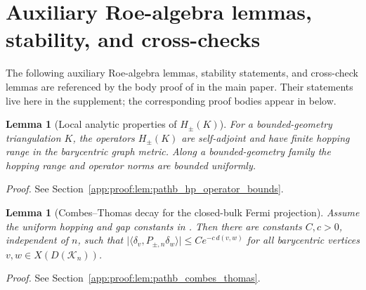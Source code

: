 \documentclass[11pt]{article}
\numberwithin{equation}{section}
\newtheorem{lemma}[theorem]{Lemma}
\theoremstyle{definition}
\theoremstyle{remark}
\newcommand{\proofref}[1]{%
  \par\noindent\emph{Proof.} See Section~\ref{#1}.\par\medskip
}
\newcommand{\proofappendixref}[1]{\proofref{#1}}
\newcommand{\K}{\mathcal{K}}
\begin{document}
\begin{table}[H]
\centering\small
\caption{Periodic triangular Bloch certificate (FHS check; reproduced from the companion script).}
\label{tab:periodic_triangular_certificate}
\end{table}

\begin{table}[H]
\centering\small
\caption{Periodic triangular extension checks (FHS).}
\label{tab:periodic_triangular_extension_certificate}
\end{table}

\section{Auxiliary Roe-algebra lemmas, stability, and cross-checks}\label{sec:roe_auxiliaries}

The following auxiliary Roe-algebra lemmas, stability statements, and cross-check lemmas are
referenced by the body proof of  in the main paper. Their
statements live here in the supplement; the corresponding proof bodies appear in
 below.

\begin{lemma}[Local analytic properties of \(H_\pm(K)\)]\label{lem:pathb_hp_operator_bounds}
For a bounded-geometry triangulation \(K\), the operators \(H_\pm(K)\) are self-adjoint and have
finite hopping range in the barycentric graph metric. Along a bounded-geometry family the
hopping range and operator norms are bounded uniformly.
\end{lemma}
\proofappendixref{app:proof:lem:pathb_hp_operator_bounds}

\begin{lemma}[Combes--Thomas decay for the closed-bulk Fermi projection]\label{lem:pathb_combes_thomas}
Assume the uniform hopping and gap constants in
. Then there are constants $C,c>0$,
independent of $n$, such that
\(\bigl|\langle\delta_v,P_{\pm,n}\delta_w\rangle\bigr|\le C e^{-c\,d(v,w)}\)
for all barycentric vertices $v,w\in X(D(\K_n))$.
\end{lemma}
\proofappendixref{app:proof:lem:pathb_combes_thomas}
\end{document}

